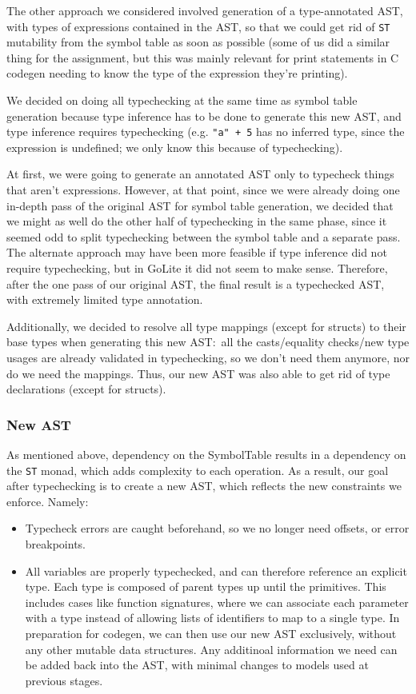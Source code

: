 \documentclass[11pt]{article}
\begin{document}
The other approach we considered involved generation of a
type-annotated AST, with types of expressions contained in the AST,
so that we could get rid of \texttt{ST} mutability from the symbol table as
soon as possible (some of us did a similar thing for the assignment,
but this was mainly relevant for print statements in C codegen
needing to know the type of the expression they're printing).

We decided on doing all typechecking at the same time as symbol
table generation because type inference has to be done to generate
this new AST, and type inference requires typechecking (e.g. \texttt{"a" +
  5} has no inferred type, since the expression is undefined; we only
know this because of typechecking).

At first, we were going to generate an annotated AST only to
typecheck things that aren't expressions. However, at that point,
since we were already doing one in-depth pass of the original AST
for symbol table generation, we decided that we might as well do the
other half of typechecking in the same phase, since it seemed odd to
split typechecking between the symbol table and a separate pass. The
alternate approach may have been more feasible if type inference did
not require typechecking, but in GoLite it did not seem to make
sense. Therefore, after the one pass of our original AST, the final
result is a typechecked AST, with extremely limited type annotation.

Additionally, we decided to resolve all type mappings (except for
structs) to their base types when generating this new AST:~all the
casts/equality checks/new type usages are already validated in
typechecking, so we don't need them anymore, nor do we need the
mappings. Thus, our new AST was also able to get rid of type
declarations (except for structs).
\subsubsection{New AST}
As mentioned above, dependency on the SymbolTable results in a
dependency on the \texttt{ST} monad, which adds complexity to each
operation.  As a result, our goal after typechecking is to create a
new AST, which reflects the new constraints we enforce.  Namely:
\begin{itemize}
\item Typecheck errors are caught beforehand, so we no longer need offsets,
or error breakpoints.
\item All variables are properly typechecked, and can therefore reference an
explicit type. Each type is composed of parent types up until the
primitives.  This includes cases like function signatures, where
we can associate each parameter with a type instead of allowing
lists of identifiers to map to a single type.  In preparation for
codegen, we can then use our new AST exclusively, without any
other mutable data structures. Any additinoal information we need
can be added back into the AST, with minimal changes to models
used at previous stages.
\end{itemize}
\end{document}
